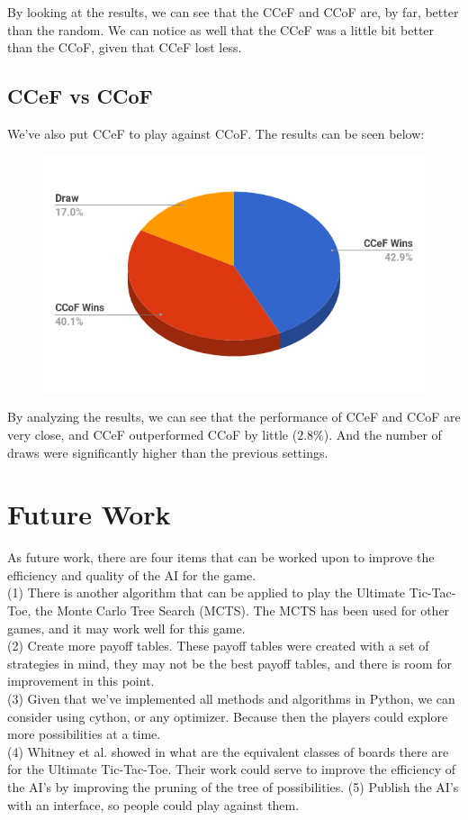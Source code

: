 \documentclass[10pt]{article}
\begin{document}
By looking at the results, we can see that the CCeF and CCoF are, by far, better than the random. We can notice as well that the CCeF was a little bit better than the CCoF, given that CCeF lost less.

\newpage
\subsection{CCeF vs CCoF}
We've also put CCeF to play against CCoF. The results can be seen below:

\begin{figure}[H]
\centering
\includegraphics[scale=0.5]{img/ccef-ccof.png}
\end{figure}

By analyzing the results, we can see that the performance of CCeF and CCoF are very close, and CCeF outperformed CCoF by little ($2.8\%$). And the number of draws were significantly higher than the previous settings.


\section{Future Work}
As future work, there are four items that can be worked upon to improve the efficiency and quality of the AI for the game.\\
(1) There is another algorithm that can be applied to play the Ultimate Tic-Tac-Toe, the Monte Carlo Tree Search (MCTS). The MCTS has been used for other games, and it may work well for this game.\\
(2) Create more payoff tables. These payoff tables were created with a set of strategies in mind, they may not be the best payoff tables, and there is room for improvement in this point.\\
(3) Given that we've implemented all methods and algorithms in Python, we can consider using cython, or any optimizer. Because then the players could explore more possibilities at a time.\\
(4) Whitney et al. showed in \cite{george2016group} what are the equivalent classes of boards there are for the Ultimate Tic-Tac-Toe. Their work could serve to improve the efficiency of the AI's by improving the pruning of the tree of possibilities.
(5) Publish the AI's with an interface, so people could play against them.
\end{document}
